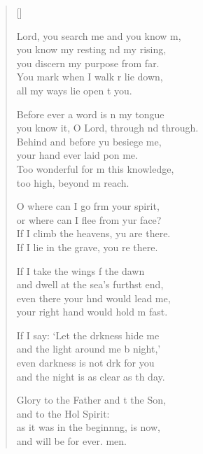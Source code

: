 \settowidth{\versewidth}{you know it, O Lord, through and through.}
\begin{verse}[\versewidth]
  \begin{patverse}
 Lord, you search me and you know m,\Flex\\
you know my resting nd my rising,\Med\\
you discern my purpose from far.\\
You mark when I walk r lie down,\Med\\
all my ways lie open t you.

Before ever a word is n my tongue\Med\\
you know it, O Lord, through nd through.\\
Behind and before yu besiege me,\Med\\
your hand ever laid pon me.\\
Too wonderful for m this knowledge,\Med\\
too high, beyond m reach.

O where can I go frm your spirit,\Med\\
or where can I flee from yur face?\\
If I climb the heavens, yu are there.\Med\\
If I lie in the grave, you re there.

If I take the wings f the dawn\Med\\
and dwell at the sea’s furthst end,\\
even there your hnd would lead me,\Med\\
your right hand would hold m fast.

If I say: ‘Let the drkness hide me\Med\\
and the light around me b night,’\\
even darkness is not drk for you\Med\\
and the night is as clear as th day.

Glory to the Father and t the Son,\Med\\
and to the Hol Spirit:\\
as it was in the beginn\pointup{\i}ng, is now,\Med\\
and will be for ever. men.
  \end{patverse}
\end{verse}
